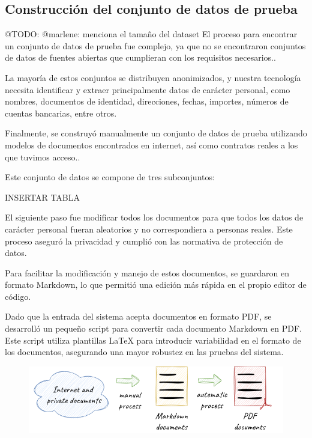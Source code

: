 \subsection*{Construcción del conjunto de datos de prueba}

\colorbox{color_highlight}{@TODO: @marlene:} menciona el tamaño del dataset
El proceso para encontrar un conjunto de datos de prueba fue complejo, ya que no se encontraron conjuntos de datos de fuentes abiertas que cumplieran con los requisitos necesarios..

La mayoría de estos conjuntos se distribuyen anonimizados, y nuestra tecnología necesita identificar y extraer principalmente datos de carácter personal, como nombres, documentos de identidad, direcciones, fechas, importes, números de cuentas bancarias, entre otros.

Finalmente, se construyó manualmente un conjunto de datos de prueba utilizando modelos de documentos encontrados en internet, así como contratos reales a los que tuvimos acceso..

Este conjunto de datos se compone de tres subconjuntos:


INSERTAR TABLA

El siguiente paso fue modificar todos los documentos para que todos los datos de carácter personal fueran aleatorios y no correspondiera a personas reales. Este proceso aseguró la privacidad y cumplió con las normativa de protección de datos.

Para facilitar la modificación y manejo de estos documentos, se guardaron en formato Markdown, lo que permitió una edición más rápida en el propio editor de código.

Dado que la entrada del sistema acepta documentos en formato PDF, se desarrolló un pequeño script para convertir cada documento Markdown en PDF. Este script utiliza plantillas LaTeX para introducir variabilidad en el formato de los documentos, asegurando una mayor robustez en las pruebas del sistema.

\begin{figure}
    \centering
    \includegraphics{./chapter/4/images/ad_4nxecxswzqiymihljxkmhkqchczjiqhus6eig0e_yq0a6yb2hktidggwooz_rykz6geygyfckw5z2v-cib6abuod5vrhxfggw}
    \caption{}
    \label{fig:ad_4nxecxswzqiymihljxkmhkqchczjiqhus6eig0e_yq0a6yb2hktidggwooz_rykz6geygyfckw5z2v-cib6abuod5vrhxfggw}
\end{figure}

